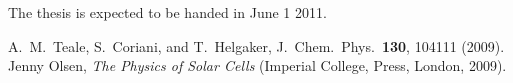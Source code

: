 The thesis is expected to be handed in June 1 2011.

\begin{thebibliography}{999}

  A.~M.~Teale, S.~Coriani, and T.~Helgaker, J.~Chem.~Phys.~{\bf 130},
104111 (2009).
 Jenny Olsen, {\em The Physics of Solar Cells} (Imperial College, Press, London,  2009).


\end{thebibliography}







